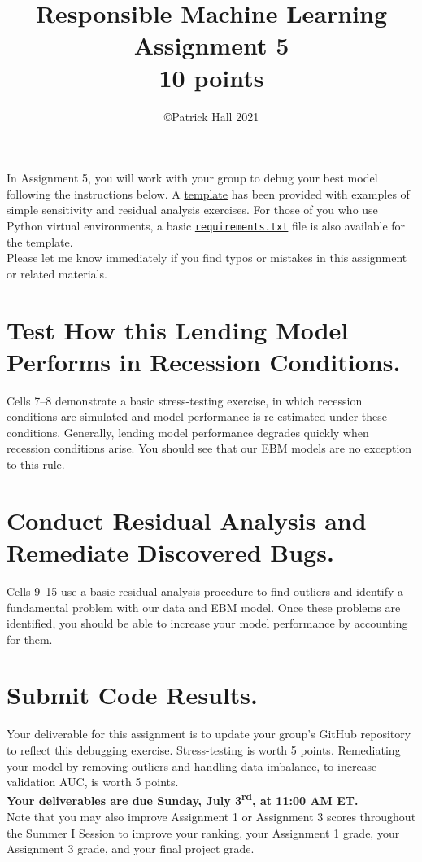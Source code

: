 \documentclass[fleqn]{article}
\title{Responsible Machine Learning\\\Large{Assignment 5}\\\Large{10 points}}
\author{\copyright Patrick Hall 2021}
\begin{document}
\maketitle

\noindent In Assignment 5, you will work with your group to debug your best model following the instructions below. A \href{https://nbviewer.jupyter.org/github/jphall663/GWU_rml/blob/master/assignments/assignment_5/assign_5_template.ipynb?flush_cache=true}{template} has been provided with examples of simple sensitivity and residual analysis exercises. For those of you who use Python virtual environments, a basic \href{https://github.com/jphall663/GWU_rml/blob/master/assignments/requirements.txt}{\texttt{requirements.txt}} file is also available for the template.\\

\noindent Please let me know immediately if you find typos or mistakes in this assignment or related materials. 

\section{Test How this Lending Model Performs in Recession Conditions.}

Cells 7--8 demonstrate a basic stress-testing exercise, in which recession conditions are simulated and model performance is re-estimated under these conditions. Generally, lending model performance degrades quickly when recession conditions arise. You should see that our EBM models are no exception to this rule.\\

\section{Conduct Residual Analysis and Remediate Discovered Bugs.}

Cells 9--15 use a basic residual analysis procedure to find outliers and identify a fundamental problem with our data and EBM model. Once these problems are identified, you should be able to increase your model performance by accounting for them.\\

\section{Submit Code Results.}

Your deliverable for this assignment is to update your group's GitHub repository to reflect this debugging exercise. Stress-testing is worth 5 points. Remediating your model by removing outliers and handling data imbalance, to increase validation AUC, is worth 5 points.\\

\noindent \textbf{Your deliverables are due Sunday, July 3\textsuperscript{rd}, at 11:00 AM ET.}\\

\noindent Note that you may also improve Assignment 1 or Assignment 3 scores throughout the Summer I Session to improve your ranking, your Assignment 1 grade, your Assignment 3 grade, and your final project grade.
\end{document}
